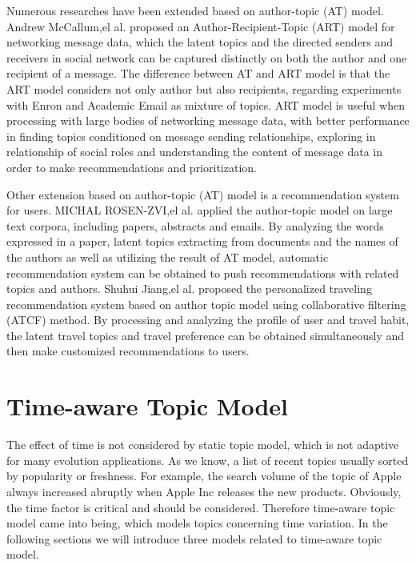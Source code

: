 Numerous researches have been extended based on author-topic (AT) model. Andrew McCallum,el al.\cite{mccallum2005author} proposed an Author-Recipient-Topic (ART) model for networking message data, which the latent topics and the directed senders and receivers in social network can be captured  distinctly on both the author and one recipient of a message. The difference between AT and ART model is that the ART model considers not only author but also recipients, regarding experiments with Enron and Academic Email as mixture of topics. ART model is useful when processing with large bodies of networking message data, with better performance in finding topics conditioned on message sending relationships,  exploring in relationship of social roles and understanding the content of message data in order to make recommendations and prioritization.

Other extension based on author-topic (AT) model is a recommendation system for users. MICHAL ROSEN-ZVI,el al. \cite{rosen2010learning} applied the author-topic model on large text corpora, including papers, abstracts and emails. By analyzing the words expressed in a paper, latent topics extracting from documents and the names of the authors as well as utilizing the result of AT model, automatic recommendation system can be obtained to push recommendations with related topics and authors. Shuhui Jiang,el al. \cite{jiang2015author} proposed the personalized traveling recommendation system based on author topic model using collaborative filtering (ATCF) method. By processing and analyzing the profile of user and travel habit, the latent travel topics and travel preference can be obtained simultaneously and then make customized recommendations to users.

\section{Time-aware Topic Model}

The effect of time is not considered by static topic model, which is not adaptive for many evolution applications. As we know, a list of recent topics usually sorted by popularity or freshness.  For example, the search volume of the topic of Apple always increased abruptly when Apple Inc releases the new products. Obviously, the time factor is critical and should be considered. Therefore time-aware topic model came into being, which models topics concerning time variation. In the following sections we will introduce three models related to time-aware topic model.

